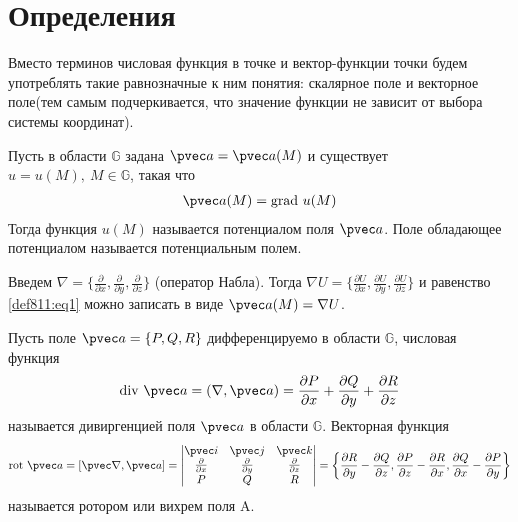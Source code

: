 \section{Определения}
Вместо терминов числовая функция в точке и вектор-функции точки будем
употреблять такие равнозначные к ним понятия: скалярное поле и векторное
поле(тем самым подчеркивается, что значение функции не зависит от выбора
системы координат).

\begin{definition}
  Пусть в области $\mathbb{G}$ задана $\pvec a = \pvec a(M)$ и существует $u =
  u(M), \ M \in \mathbb{G}$, такая что
  \begin{gather}
    \pvec a(M) = \mbox{grad} \ u(M)
    \label{def811:eq1}
  \end{gather}
  Тогда функция $u(M)$ называется потенциалом поля $\pvec a$. Поле обладающее
  потенциалом называется потенциальным полем.
\end{definition}

Введем $\nabla = \{\frac{\partial}{\partial x}, \frac{\partial}{\partial y},
\frac{\partial}{\partial z}\}$ (оператор Набла). Тогда $\nabla U =
\{\frac{\partial U}{\partial x}, \frac{\partial U}{\partial y},
\frac{\partial U}{\partial z}\}$ и равенство \eqref{def811:eq1} можно записать
в виде $\pvec a(M) = \nabla U$.

\begin{definition}
  Пусть поле $\pvec a = \{P, Q, R\}$ дифференцируемо в области $\mathbb{G}$,
  числовая функция
  \begin{gather*}
    \mbox{div} \ \pvec a = (\nabla, \pvec a) = \frac{\partial P}{\partial x} +
    \frac{\partial Q}{\partial y} + \frac{\partial R}{\partial z}
  \end{gather*}
  называется дивиргенцией поля $\pvec a$ в области $\mathbb{G}$.
  Векторная функция
  \begin{gather*}
    \mbox{rot} \ \pvec a = [\pvec \nabla, \pvec a] =
    \begin{vmatrix}
      \pvec i & \pvec j & \pvec k \\
      \frac{\partial }{\partial x} & \frac{\partial }{\partial y} &
      \frac{\partial }{\partial z} \\
      P & Q & R
    \end{vmatrix} =
    \left\{\frac{\partial R}{\partial y} - \frac{\partial Q}{\partial z},
    \frac{\partial P}{\partial z} - \frac{\partial R}{\partial x},
    \frac{\partial Q}{\partial x} - \frac{\partial P}{\partial y}\right\}
  \end{gather*}
  называется ротором или вихрем поля A.
\end{definition}

